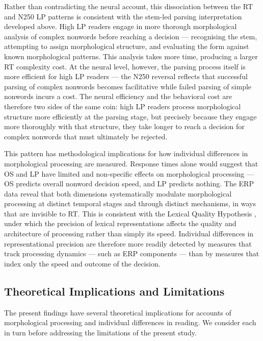 \documentclass[utf8]{FrontiersinHarvard} %
\begin{document}
	Rather than contradicting the neural account, this dissociation between the RT and N250 LP patterns is consistent with the stem-led parsing interpretation developed above. High LP readers engage in more thorough morphological analysis of complex nonwords before reaching a decision --- recognising the stem, attempting to assign morphological structure, and evaluating the form against known morphological patterns. This analysis takes more time, producing a larger RT complexity cost. At the neural level, however, the parsing process itself is more efficient for high LP readers --- the N250 reversal reflects that successful parsing of complex nonwords becomes facilitative while failed parsing of simple nonwords incurs a cost. The neural efficiency and the behavioral cost are therefore two sides of the same coin: high LP readers process morphological structure more efficiently at the parsing stage, but precisely because they engage more thoroughly with that structure, they take longer to reach a decision for complex nonwords that must ultimately be rejected.

	This pattern has methodological implications for how individual differences in morphological processing are measured. Response times alone would suggest that OS and LP have limited and non-specific effects on morphological processing --- OS predicts overall nonword decision speed, and LP predicts nothing. The ERP data reveal that both dimensions systematically modulate morphological processing at distinct temporal stages and through distinct mechanisms, in ways that are invisible to RT. This is consistent with the Lexical Quality Hypothesis \citep{perfettiReadingAbilityLexical2007}, under which the precision of lexical representations affects the quality and architecture of processing rather than simply its speed. Individual differences in representational precision are therefore more readily detected by measures that track processing dynamics --- such as ERP components --- than by measures that index only the speed and outcome of the decision.
	
	\subsection{Theoretical Implications and Limitations}
	
	The present findings have several theoretical implications for accounts of morphological processing and individual differences in reading. We consider each in turn before addressing the limitations of the present study.
	
\end{document}
